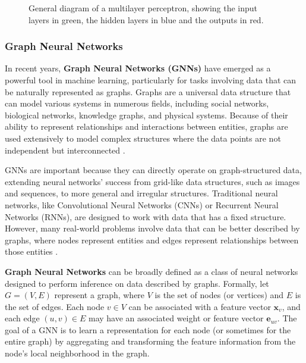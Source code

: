 \begin{figure}
    \centering
    \setlength{}        
    \setlength{}
    \resizebox{\figurewidth}{\figureheight}{}
    \caption{General diagram of a multilayer perceptron, showing the input layers in green, the hidden layers in blue and the outputs in red.}\label{fig:FCNN_representation}
\end{figure}


\subsubsection{Graph Neural Networks}

In recent years, \textbf{Graph Neural Networks (GNNs)} have emerged as a powerful tool in machine learning, particularly for tasks involving data that can be naturally represented as graphs. Graphs are a universal data structure that can model various systems in numerous fields, including social networks, biological networks, knowledge graphs, and physical systems. Because of their ability to represent relationships and interactions between entities, graphs are used extensively to model complex structures where the data points are not independent but interconnected \cite{Jia_Wang_Shou_Hosseini_Bai_2023}.

GNNs are important because they can directly operate on graph-structured data, extending neural networks' success from grid-like data structures, such as images and sequences, to more general and irregular structures. Traditional neural networks, like Convolutional Neural Networks (CNNs) or Recurrent Neural Networks (RNNs), are designed to work with data that has a fixed structure. However, many real-world problems involve data that can be better described by graphs, where nodes represent entities and edges represent relationships between those entities \cite{Gupta_Matta_Pant_2021}. 

\textbf{Graph Neural Networks} can be broadly defined as a class of neural networks designed to perform inference on data described by graphs. Formally, let $G = (V, E)$ represent a graph, where $V$ is the set of nodes (or vertices) and $E$ is the set of edges. Each node $v \in V$ can be associated with a feature vector $\mathbf{x}_v$, and each edge $(u, v) \in E$ may have an associated weight or feature vector $\mathbf{e}_{uv}$. The goal of a GNN is to learn a representation for each node (or sometimes for the entire graph) by aggregating and transforming the feature information from the node's local neighborhood in the graph.


